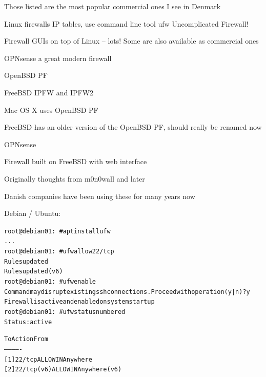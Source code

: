 \documentclass[Screen16to9,17pt]{foils}
\begin{document}
Those listed are the most popular commercial ones I see in Denmark


\begin{list2}
\item Linux firewalls IP tables, use command line tool ufw Uncomplicated Firewall!
\item Firewall GUIs on top of Linux -- lots! Some are also available as commercial ones
\item OPNsense a great modern firewall 
\item OpenBSD PF
\item FreeBSD IPFW and IPFW2 
\item Mac OS X uses OpenBSD PF
\item FreeBSD has an older version of the OpenBSD PF, should really be renamed now
\end{list2}




\begin{list2}
\item OPNsense 
\item Firewall built on FreeBSD with web interface
\item Originally thoughts from m0n0wall and later \\
\item Danish companies have been using these for many years now
\end{list2}



Debian / Ubuntu:
\begin{alltt}\scriptsize
root@debian01:~# apt install ufw
...
root@debian01:~# ufw allow 22/tcp
Rules updated
Rules updated (v6)
root@debian01:~# ufw enable
Command may disrupt existing ssh connections. Proceed with operation (y|n)? y
Firewall is active and enabled on system startup
root@debian01:~# ufw status numbered
Status: active

     To                         Action      From
     --                         ------      ----
[ 1] 22/tcp                     ALLOW IN    Anywhere
[ 2] 22/tcp (v6)                ALLOW IN    Anywhere (v6)
\end{alltt}
\end{document}

